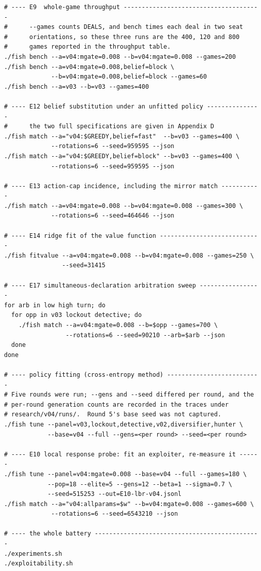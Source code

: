 \begin{verbatim}
# ---- E9  whole-game throughput --------------------------------------
#      --games counts DEALS, and bench times each deal in two seat
#      orientations, so these three runs are the 400, 120 and 800
#      games reported in the throughput table.
./fish bench --a=v04:mgate=0.008 --b=v04:mgate=0.008 --games=200
./fish bench --a=v04:mgate=0.008,belief=block \
             --b=v04:mgate=0.008,belief=block --games=60
./fish bench --a=v03 --b=v03 --games=400

# ---- E12 belief substitution under an unfitted policy ---------------
#      the two full specifications are given in Appendix D
./fish match --a="v04:$GREEDY,belief=fast"  --b=v03 --games=400 \
             --rotations=6 --seed=959595 --json
./fish match --a="v04:$GREEDY,belief=block" --b=v03 --games=400 \
             --rotations=6 --seed=959595 --json

# ---- E13 action-cap incidence, including the mirror match -----------
./fish match --a=v04:mgate=0.008 --b=v04:mgate=0.008 --games=300 \
             --rotations=6 --seed=464646 --json

# ---- E14 ridge fit of the value function ----------------------------
./fish fitvalue --a=v04:mgate=0.008 --b=v04:mgate=0.008 --games=250 \
                --seed=31415

# ---- E17 simultaneous-declaration arbitration sweep -----------------
for arb in low high turn; do
  for opp in v03 lockout detective; do
    ./fish match --a=v04:mgate=0.008 --b=$opp --games=700 \
                 --rotations=6 --seed=90210 --arb=$arb --json
  done
done

# ---- policy fitting (cross-entropy method) --------------------------
# Five rounds were run; --gens and --seed differed per round, and the
# per-round generation counts are recorded in the traces under
# research/v04/runs/.  Round 5's base seed was not captured.
./fish tune --panel=v03,lockout,detective,v02,diversifier,hunter \
            --base=v04 --full --gens=<per round> --seed=<per round>

# ---- E10 local response probe: fit an exploiter, re-measure it ------
./fish tune --panel=v04:mgate=0.008 --base=v04 --full --games=180 \
            --pop=18 --elite=5 --gens=12 --beta=1 --sigma=0.7 \
            --seed=515253 --out=E10-lbr-v04.jsonl
./fish match --a="v04:allparams=$w" --b=v04:mgate=0.008 --games=600 \
             --rotations=6 --seed=6543210 --json

# ---- the whole battery ----------------------------------------------
./experiments.sh
./exploitability.sh
\end{verbatim}

